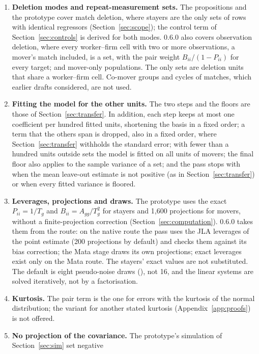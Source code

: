 \begin{enumerate}[leftmargin=1.6em,itemsep=3pt]
\item \textbf{Deletion modes and repeat-measurement sets.} The propositions and the prototype cover match
deletion, where stayers are the only sets of rows with identical regressors (Section~\ref{sec:scope}); the control
term of Section~\ref{sec:controls} is derived for both modes. 0.6.0 also covers observation deletion,
where every worker--firm cell with two or more observations, a mover's match included, is a set, with the pair
weight $B_{ii}/(1-P_{ii})$ for every target; and mover-only populations. The only sets are deletion units that
share a worker--firm cell. Co-mover groups and cycles of matches, which earlier drafts considered, are not used.
\item \textbf{Fitting the model for the other units.} The two steps and the floors are those of
Section~\ref{sec:transfer}. In addition, each step keeps at most one coefficient per hundred fitted units,
shortening the basis in a fixed order; a term that the others span is dropped, also in a fixed order, where
Section~\ref{sec:transfer} withholds the standard error; with fewer than a hundred units outside sets the model is fitted on all units
of movers; the final floor also applies to the sample variance of a set; and the pass stops with
 when the mean leave-out estimate is not positive (as in Section~\ref{sec:transfer}) or when every
fitted variance is floored.
\item \textbf{Leverages, projections and draws.} The prototype uses the exact $P_{ii}=1/T_g$ and
$B_{ii}=A_{gg}/T_g^2$ for stayers and 1{,}600 projections for movers, without a finite-projection correction
(Section~\ref{sec:computation}). 0.6.0 takes them from the route: on the native route the pass uses the JLA
leverages of the point estimate (200 projections by default) and checks them against its bias correction; the
Mata  stage draws its own projections; exact leverages exist only on the Mata
 route. The stayers' exact values are not substituted. The
default is eight pseudo-noise draws (), not 16, and the linear systems are solved
iteratively, not by a factorisation.
\item \textbf{Kurtosis.} The pair term is the one for errors with the kurtosis of the normal distribution; the
variant for another stated kurtosis (Appendix~\ref{app:proofs}) is not offered.
\item \textbf{No projection of the covariance.} The prototype's simulation of Section~\ref{sec:sim} set negative

\end{enumerate}

